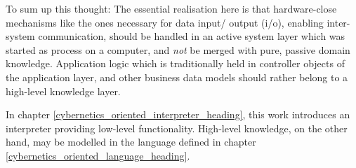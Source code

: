 To sum up this thought: The essential realisation here is that hardware-close
mechanisms like the ones necessary for data input/ output (i/o), enabling
inter-system communication, should be handled in an active system layer which
was started as process on a computer, and \emph{not} be merged with pure,
passive domain knowledge. Application logic which is traditionally held in
controller objects of the application layer, and other business data models
should rather belong to a high-level knowledge layer.

In chapter \ref{cybernetics_oriented_interpreter_heading}, this work introduces
an interpreter providing low-level functionality. High-level knowledge, on the
other hand, may be modelled in the language defined in chapter
\ref{cybernetics_oriented_language_heading}.
